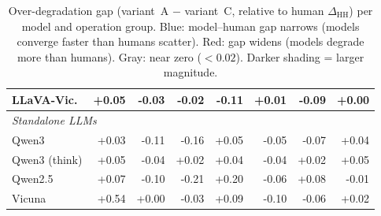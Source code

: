 \begin{table}[h]
\begin{tabular}{lrrrrrrr}
LLaVA-Vic. & \cellcolor{blue!10}+0.05 & \cellcolor{red!10}-0.03 & \cellcolor{red!10}-0.02 & \cellcolor{red!14}-0.11 & \cellcolor{gray!10}+0.01 & \cellcolor{red!11}-0.09 & \cellcolor{gray!10}+0.00 \\
\midrule
\multicolumn{8}{l}{\textit{Standalone LLMs}} \\
Qwen3 & \cellcolor{blue!10}+0.03 & \cellcolor{red!14}-0.11 & \cellcolor{red!20}-0.16 & \cellcolor{blue!10}+0.05 & \cellcolor{red!10}-0.05 & \cellcolor{red!10}-0.07 & \cellcolor{blue!10}+0.04 \\
Qwen3 (think) & \cellcolor{blue!10}+0.05 & \cellcolor{red!10}-0.04 & \cellcolor{gray!10}+0.02 & \cellcolor{blue!10}+0.04 & \cellcolor{red!10}-0.04 & \cellcolor{gray!10}+0.02 & \cellcolor{blue!10}+0.05 \\
Qwen2.5 & \cellcolor{blue!10}+0.07 & \cellcolor{red!13}-0.10 & \cellcolor{red!28}-0.21 & \cellcolor{blue!26}+0.20 & \cellcolor{red!10}-0.06 & \cellcolor{blue!11}+0.08 & \cellcolor{gray!10}-0.01 \\
Vicuna & \cellcolor{blue!40}+0.54 & \cellcolor{gray!10}+0.00 & \cellcolor{red!10}-0.03 & \cellcolor{blue!11}+0.09 & \cellcolor{red!13}-0.10 & \cellcolor{red!10}-0.06 & \cellcolor{blue!10}+0.02 \\
\bottomrule
\end{tabular}
\caption{Over-degradation gap (variant~A $-$ variant~C, relative to human $\Delta_{\text{HH}}$) per model and operation group. \colorbox{blue!20}{Blue}: model--human gap narrows (models converge faster than humans scatter). \colorbox{red!20}{Red}: gap widens (models degrade more than humans). \colorbox{gray!10}{Gray}: near zero ($<0.02$). Darker shading = larger magnitude.}
\label{tab:op_overdeg_per_model}
\end{table}
